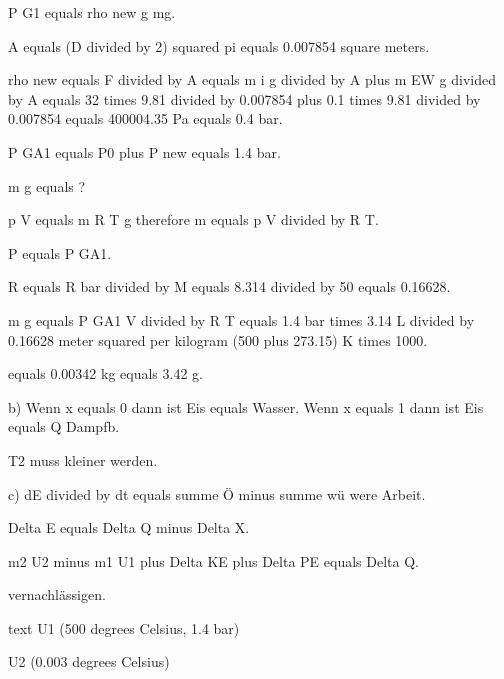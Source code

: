 P G1 equals rho new g mg.

A equals (D divided by 2) squared pi equals 0.007854 square meters.

rho new equals F divided by A equals m i g divided by A plus m EW g divided by A equals 32 times 9.81 divided by 0.007854 plus 0.1 times 9.81 divided by 0.007854 equals 400004.35 Pa equals 0.4 bar.

P GA1 equals P0 plus P new equals 1.4 bar.

m g equals ?

p V equals m R T g therefore m equals p V divided by R T.

P equals P GA1.

R equals R bar divided by M equals 8.314 divided by 50 equals 0.16628.

m g equals P GA1 V divided by R T equals 1.4 bar times 3.14 L divided by 0.16628 meter squared per kilogram (500 plus 273.15) K times 1000.

equals 0.00342 kg equals 3.42 g.

b) Wenn x equals 0 dann ist Eis equals Wasser. Wenn x equals 1 dann ist Eis equals Q Dampfb.

T2 muss kleiner werden.

c) dE divided by dt equals summe Ö minus summe wü were Arbeit.

Delta E equals Delta Q minus Delta X.

m2 U2 minus m1 U1 plus Delta KE plus Delta PE equals Delta Q.

vernachlässigen.

text U1 (500 degrees Celsius, 1.4 bar)

U2 (0.003 degrees Celsius)